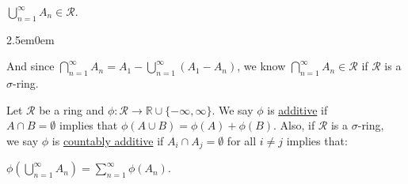 \documentclass{book}
\newcommand{\hTwo}{%
   \color{MidnightBlue}%
   \fontsize{13}{15}\selectfont%
}
\newenvironment{myIndent}{%
   \begin{adjustwidth}{2.5em}{0em}%
}{%
   \end{adjustwidth}%
}
\newcommand{\udefine}[1]{{%
   \setulcolor{Red}%
   \setul{0.14em}{0.07em}%
   \ul{#1}%
}}
\newcommand{\retTwo}{\hfill\bigbreak}
\begin{document}
{\centering $\bigcup\limits_{n=1}^\infty A_n \in \mathcal{R}$. \\ [-8pt]\par}

{\begin{myIndent}\hTwo
   And since $\bigcap\limits_{n=1}^\infty A_n = A_1 - \bigcup\limits_{n=1}^\infty (A_1 - A_n)$, we know $\bigcap\limits_{n=1}^\infty A_n \in \mathcal{R}$ if $\mathcal{R}$ is a $\sigma$-ring.\retTwo
\end{myIndent}}

Let $\mathcal{R}$ be a ring and $\phi: \mathcal{R} \longrightarrow \mathbb{R} \cup \{-\infty, \infty\}$. We say $\phi$ is \udefine{additive} if\\ $A \cap B = \emptyset$ implies that $\phi(A \cup B) = \phi(A) + \phi(B)$. Also, if $\mathcal{R}$ is a $\sigma$-ring,\\ we say $\phi$ is \udefine{countably additive} if $A_i \cap A_j = \emptyset$ for all $i \neq j$ implies that:

{\center$\phi\left(\bigcup\limits_{n=1}^\infty A_n\right) = \sum\limits_{n=1}^\infty \phi(A_n)$.\retTwo\par}

\newpage
\end{document}
